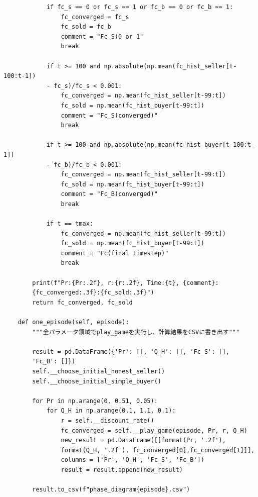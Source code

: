 \documentclass[a4paper,fontsize=11pt,report,notitlepage,line_length=38zw,number_of_lines=40,dvipdfmx]{jlreq}
\begin{document}
\begin{lstlisting}
            if fc_s == 0 or fc_s == 1 or fc_b == 0 or fc_b == 1:
                fc_converged = fc_s
                fc_sold = fc_b
                comment = "Fc_S(0 or 1"
                break

            if t >= 100 and np.absolute(np.mean(fc_hist_seller[t-100:t-1]) 
            - fc_s)/fc_s < 0.001:
                fc_converged = np.mean(fc_hist_seller[t-99:t])
                fc_sold = np.mean(fc_hist_buyer[t-99:t])
                comment = "Fc_S(converged)"
                break

            if t >= 100 and np.absolute(np.mean(fc_hist_buyer[t-100:t-1]) 
            - fc_b)/fc_b < 0.001:
                fc_converged = np.mean(fc_hist_seller[t-99:t])
                fc_sold = np.mean(fc_hist_buyer[t-99:t])
                comment = "Fc_B(converged)"
                break

            if t == tmax:
                fc_converged = np.mean(fc_hist_seller[t-99:t])
                fc_sold = np.mean(fc_hist_buyer[t-99:t])
                comment = "Fc(final timestep)"
                break

        print(f"Pr:{Pr:.2f}, r:{r:.2f}, Time:{t}, {comment}:
        {fc_converged:.3f}:{fc_sold:.3f}")
        return fc_converged, fc_sold

    def one_episode(self, episode):
        """全パラメータ領域でplay_gameを実行し、計算結果をCSVに書き出す"""

        result = pd.DataFrame({'Pr': [], 'Q_H': [], 'Fc_S': [], 
        'Fc_B': []})
        self.__choose_initial_honest_seller()
        self.__choose_initial_simple_buyer()

        for Pr in np.arange(0, 0.51, 0.05):
            for Q_H in np.arange(0.1, 1.1, 0.1):
                r = self.__discount_rate()
                fc_converged = self.__play_game(episode, Pr, r, Q_H)
                new_result = pd.DataFrame([[format(Pr, '.2f'), 
                format(Q_H, '.2f'), fc_converged[0],fc_converged[1]]], 
                columns = ['Pr', 'Q_H', 'Fc_S', 'Fc_B'])
                result = result.append(new_result)
        
        result.to_csv(f"phase_diagram{episode}.csv")

\end{lstlisting}
\newpage
\end{document}
